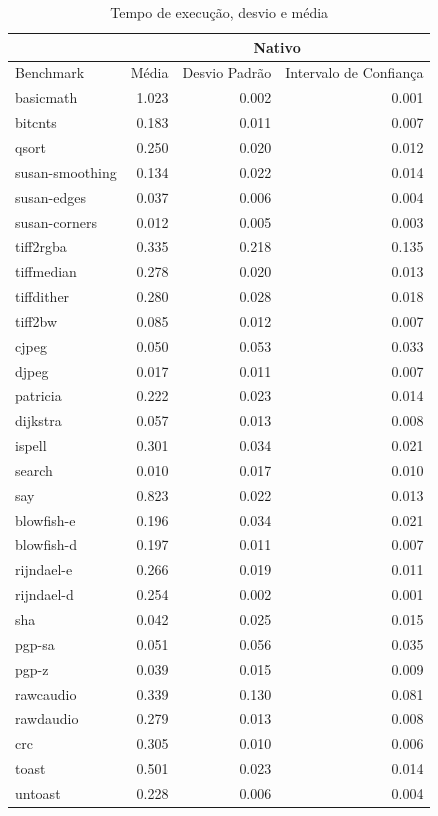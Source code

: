 \documentclass[11pt,twoside]{article}
\begin{document}
\begin{table}
 \caption{Tempo de execução, desvio e média}
 \begin{center}
 \begin{tabular}{|l|r|r|r|}
   \cline{2-4}
   \multicolumn{1}{c|}{}& \multicolumn{3}{|c|}{Nativo} \\ \hline
   Benchmark & Média & Desvio Padrão & Intervalo de Confiança \\ \hline
   basicmath & 1.023 & 0.002 & 0.001\\ \hline
   bitcnts & 0.183 & 0.011 & 0.007\\ \hline
   qsort & 0.250 & 0.020 & 0.012\\ \hline
   susan-smoothing & 0.134 & 0.022 & 0.014\\ \hline
   susan-edges & 0.037 & 0.006 & 0.004\\ \hline
   susan-corners & 0.012 & 0.005 & 0.003\\ \hline
   tiff2rgba & 0.335 & 0.218 & 0.135\\ \hline
   tiffmedian & 0.278 & 0.020 & 0.013\\ \hline 
   tiffdither & 0.280 & 0.028 & 0.018\\ \hline 
   tiff2bw & 0.085 & 0.012 & 0.007\\ \hline 
   cjpeg & 0.050 & 0.053 & 0.033\\ \hline 
   djpeg & 0.017 & 0.011 & 0.007\\ \hline 
   patricia & 0.222 & 0.023 & 0.014\\ \hline 
   dijkstra & 0.057 & 0.013 & 0.008\\ \hline 
   ispell & 0.301 & 0.034 & 0.021\\ \hline 
   search & 0.010 & 0.017 & 0.010\\ \hline 
   say & 0.823 & 0.022 & 0.013\\ \hline 
   blowfish-e & 0.196 & 0.034 & 0.021\\ \hline 
   blowfish-d & 0.197 & 0.011 & 0.007\\ \hline 
   rijndael-e & 0.266 & 0.019 & 0.011\\ \hline 
   rijndael-d & 0.254 & 0.002 & 0.001\\ \hline 
   sha & 0.042 & 0.025 & 0.015\\ \hline 
   pgp-sa & 0.051 & 0.056 & 0.035\\ \hline 
   pgp-z & 0.039 & 0.015 & 0.009\\ \hline 
   rawcaudio & 0.339 & 0.130 & 0.081\\ \hline 
   rawdaudio & 0.279 & 0.013 & 0.008\\ \hline 
   crc & 0.305 & 0.010 & 0.006\\ \hline 
   toast & 0.501 & 0.023 & 0.014\\ \hline 
   untoast & 0.228 & 0.006 & 0.004 \\
   \hline
  \end{tabular}
  \label{tab:tempos_nativo}
 \end{center}
\end{table}
\end{document}

